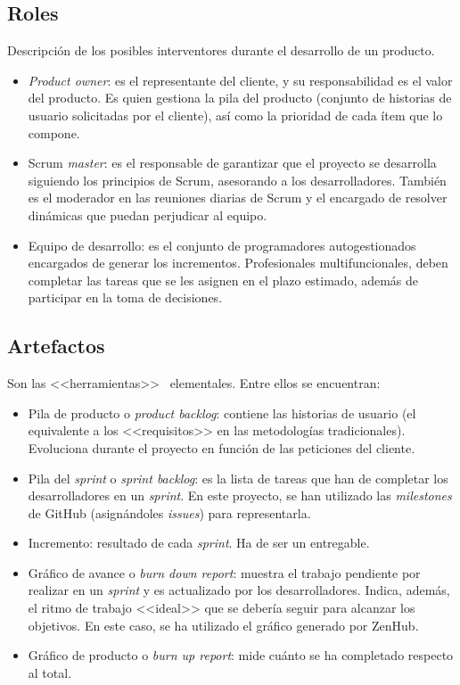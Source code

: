 \subsection{Roles}
Descripción de los posibles interventores durante el desarrollo de un producto.

\begin{itemize}
	\item \textit{Product owner}: es el representante del cliente, y su responsabilidad es el valor del producto. Es quien gestiona la pila del producto (conjunto de historias de usuario solicitadas por el cliente), así como la prioridad de cada ítem que lo compone.
	
	\item Scrum \textit{master}: es el responsable de garantizar que el proyecto se desarrolla siguiendo los principios de Scrum, asesorando a los desarrolladores. También es el moderador en las reuniones diarias de Scrum y el encargado de resolver dinámicas que puedan perjudicar al equipo.
	
	\item Equipo de desarrollo: es el conjunto de programadores autogestionados encargados de generar los incrementos. Profesionales multifuncionales, deben completar las tareas que se les asignen en el plazo estimado, además de participar en la toma de decisiones.
\end{itemize}

\subsection{Artefactos}

Son las <<herramientas>>~\cite{scrumMaster2022} elementales. Entre ellos se encuentran:

\begin{itemize}
	\item Pila de producto o \textit{product backlog}: contiene las historias de usuario (el equivalente a los <<requisitos>> en las metodologías tradicionales). Evoluciona durante el proyecto en función de las peticiones del cliente.
	\item Pila del \textit{sprint} o \textit{sprint backlog}: es la lista de tareas que han de completar los desarrolladores en un \textit{sprint}. En este proyecto, se han utilizado las \textit{milestones} de GitHub (asignándoles \textit{issues}) para representarla.
	\item Incremento: resultado de cada \textit{sprint}. Ha de ser un entregable.
	\item Gráfico de avance o \textit{burn down report}: muestra el trabajo pendiente por realizar en un \textit{sprint} y es actualizado por los desarrolladores. Indica, además, el ritmo de trabajo <<ideal>> que se debería seguir para alcanzar los objetivos. En este caso, se ha utilizado el gráfico generado por ZenHub.
	\item Gráfico de producto o \textit{burn up report}: mide cuánto se ha completado respecto al total.
\end{itemize}

